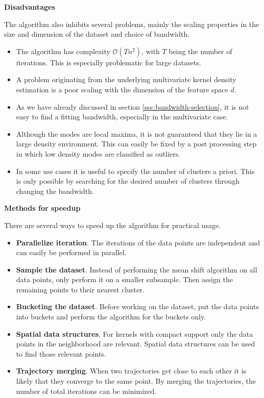 \documentclass{article}
\begin{document}
\textbf{Disadvantages}

The algorithm also inhibits several problems, mainly the scaling properties in the size and dimension of the dataset and choice of bandwidth.

\begin{itemize}
	\item The algorithm has complexity $\mathcal{O}(Tn^2)$, with $T$ being the number of iterations. This is especially problematic for large datasets.
	
	\item A problem originating from the underlying multivariate kernel density estimation is a poor scaling with the dimension of the feature space $d$.
	
	\item As we have already discussed in section \ref{sec:bandwidth-selection}, it is not easy to find a fitting bandwidth, especially in the multivariate case.
	
	\item Although the modes are local maxima, it is not guaranteed that they lie in a large density environment. This can easily be fixed by a post processing step in which low density modes are classified as outliers.
	
	\item In some use cases it is useful to specify the number of clusters a priori. This is only possible by searching for the desired number of clusters through changing the bandwidth.
\end{itemize}

\textbf{Methods for speedup}

There are several ways to speed up the algorithm for practical usage.
\begin{itemize}
	\item \textbf{Parallelize iteration}. The iterations of the data points are independent and can easily be performed in parallel.
	
	\item \textbf{Sample the dataset}. Instead of performing the mean shift algorithm on all data points, only perform it on a smaller subsample. Then assign the remaining points to their nearest cluster.
	
	\item \textbf{Bucketing the dataset}. Before working on the dataset, put the data points into buckets and perform the algorithm for the buckets only.
	
	\item \textbf{Spatial data structures}. For kernels with compact support only the data points in the neighborhood are relevant. Spatial data structures can be used to find those relevant points.
	
	\item \textbf{Trajectory merging}. When two trajectories get close to each other it is likely that they converge to the same point. By merging the trajectories, the number of total iterations can be minimized.
\end{itemize}
\end{document}
